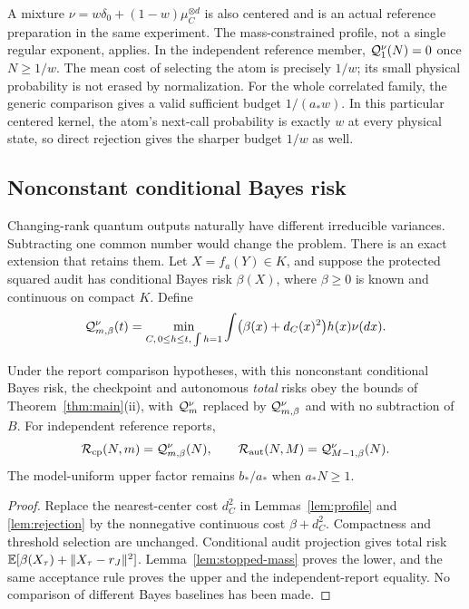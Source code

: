 A mixture $\nu=w\delta_0+(1-w)\mu_C^{\otimes d}$ is also centered and is an actual reference preparation in the same experiment. The mass-constrained profile, not a single regular exponent, applies. In the independent reference member, $\mathcal Q_1^\nu(N)=0$ once $N\ge1/w$. The mean cost of selecting the atom is precisely $1/w$; its small physical probability is not erased by normalization. For the whole correlated family, the generic comparison gives a valid sufficient budget $1/(a_*w)$. In this particular centered kernel, the atom's next-call probability is exactly $w$ at every physical state, so direct rejection gives the sharper budget $1/w$ as well.

\subsection{Nonconstant conditional Bayes risk}
Changing-rank quantum outputs naturally have different irreducible variances. Subtracting one common number would change the problem. There is an exact extension that retains them. Let $X=f_a(Y)\in K$, and suppose the protected squared audit has conditional Bayes risk $\beta(X)$, where $\beta\ge0$ is known and continuous on compact $K$. Define
\begin{equation}\label{eq:weighted-profile}
 \mathcal Q_{m,\beta}^\nu(t)=\min_{C,\,0\le h\le t,\,\int h=1}
       \int\bigl(\beta(x)+d_C(x)^2\bigr)h(x)\nu(dx).
\end{equation}

\begin{corollary}\label{cor:weighted-profile}
Under the report comparison hypotheses, with this nonconstant conditional Bayes risk, the checkpoint and autonomous \emph{total} risks obey the bounds of Theorem~\ref{thm:main}(ii), with $\mathcal Q_m^\nu$ replaced by $\mathcal Q_{m,\beta}^\nu$ and with no subtraction of $B$. For independent reference reports,
\begin{equation}\label{eq:weighted-exact}
 \mathcal R_{\mathrm{cp}}(N,m)=\mathcal Q_{m,\beta}^\nu(N),\qquad
 \mathcal R_{\mathrm{aut}}(N,M)=\mathcal Q_{M-1,\beta}^\nu(N).
\end{equation}
The model-uniform upper factor remains $b_*/a_*$ when $a_*N\ge1$.
\end{corollary}
\begin{proof}
Replace the nearest-center cost $d_C^2$ in Lemmas~\ref{lem:profile} and \ref{lem:rejection} by the nonnegative continuous cost $\beta+d_C^2$. Compactness and threshold selection are unchanged. Conditional audit projection gives total risk $\mathbb E[\beta(X_\tau)+\lVert X_\tau-r_J\rVert^2]$. Lemma~\ref{lem:stopped-mass} proves the lower, and the same acceptance rule proves the upper and the independent-report equality. No comparison of different Bayes baselines has been made.
\end{proof}


